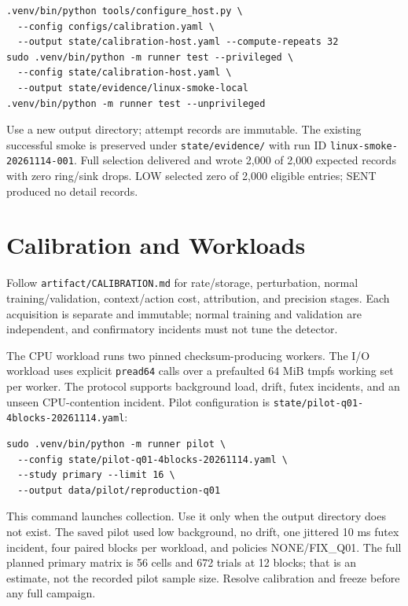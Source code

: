 \documentclass[10pt]{article}
\begin{document}
\begin{lstlisting}
.venv/bin/python tools/configure_host.py \
  --config configs/calibration.yaml \
  --output state/calibration-host.yaml --compute-repeats 32
sudo .venv/bin/python -m runner test --privileged \
  --config state/calibration-host.yaml \
  --output state/evidence/linux-smoke-local
.venv/bin/python -m runner test --unprivileged
\end{lstlisting}

Use a new output directory; attempt records are immutable. The existing successful smoke is preserved under \texttt{state/evidence/} with run ID \texttt{linux-smoke-20261114-001}. Full selection delivered and wrote 2,000 of 2,000 expected records with zero ring/sink drops. LOW selected zero of 2,000 eligible entries; SENT produced no detail records.

\section{Calibration and Workloads}
Follow \texttt{artifact/CALIBRATION.md} for rate/storage, perturbation, normal training/validation, context/action cost, attribution, and precision stages. Each acquisition is separate and immutable; normal training and validation are independent, and confirmatory incidents must not tune the detector.

The CPU workload runs two pinned checksum-producing workers. The I/O workload uses explicit \texttt{pread64} calls over a prefaulted 64 MiB tmpfs working set per worker. The protocol supports background load, drift, futex incidents, and an unseen CPU-contention incident. Pilot configuration is \texttt{state/pilot-q01-4blocks-20261114.yaml}:

\begin{lstlisting}
sudo .venv/bin/python -m runner pilot \
  --config state/pilot-q01-4blocks-20261114.yaml \
  --study primary --limit 16 \
  --output data/pilot/reproduction-q01
\end{lstlisting}

This command launches collection. Use it only when the output directory does not exist. The saved pilot used low background, no drift, one jittered 10 ms futex incident, four paired blocks per workload, and policies NONE/FIX\_Q01. The full planned primary matrix is 56 cells and 672 trials at 12 blocks; that is an estimate, not the recorded pilot sample size. Resolve calibration and freeze before any full campaign.
\end{document}
